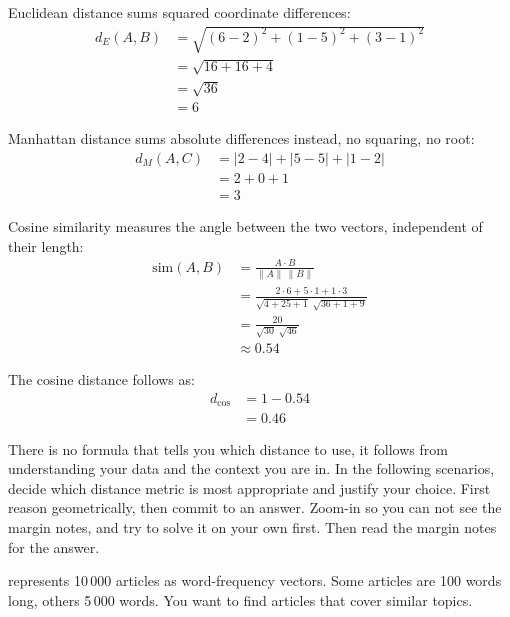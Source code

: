 \vspace{1em}

Euclidean distance sums squared coordinate differences:
\begin{align*}
    d_E(A, B) &= \sqrt{(6{-}2)^2 + (1{-}5)^2 + (3{-}1)^2} \\
              &= \sqrt{16 + 16 + 4} \\
              &= \sqrt{36} \\
              &= 6
\end{align*}

Manhattan distance sums absolute differences instead, no squaring, no root:
\begin{align*}
    d_M(A, C) &= |2{-}4| + |5{-}5| + |1{-}2| \\
              &= 2 + 0 + 1 \\
              &= 3
\end{align*}

Cosine similarity measures the angle between the two vectors, independent of their length:
\begin{align*}
    \text{sim}(A, B) &= \frac{A \cdot B}{\|A\|\,\|B\|}\\
    &= \frac{2{\cdot}6 + 5{\cdot}1 + 1{\cdot}3}{\sqrt{4{+}25{+}1}\;\sqrt{36{+}1{+}9}}\\
    &= \frac{20}{\sqrt{30}\;\sqrt{46}} \\
    &\approx 0.54
\end{align*}

The cosine distance follows as:
\begin{align*}
    d_{\text{cos}} &= 1 - 0.54 \\
                   &= 0.46
\end{align*}



 There is no formula that tells you which distance to use, it follows from understanding your data and the context you are in. In the following scenarios,
decide which distance metric is most appropriate and justify your choice. First reason geometrically, then commit to an answer. 
Zoom-in so you can not see the margin notes, and try to solve it on your own first. Then read the margin notes for the answer.

 represents 10\,000 articles as word-frequency vectors. Some articles are 100 words long, others 5\,000 words. You want to find articles that cover similar topics.

